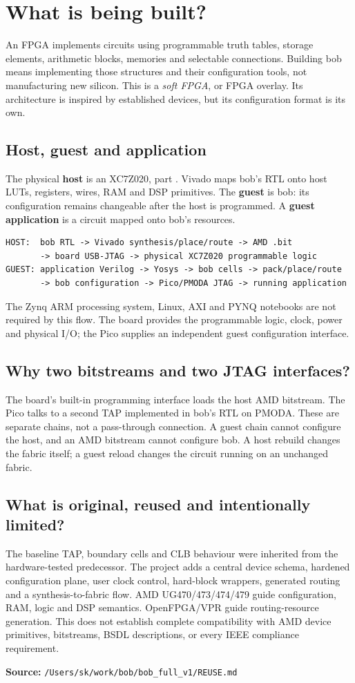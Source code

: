 \documentclass[11pt,a4paper]{article}
\newcommand{\code}[1]{\texttt{\detokenize{#1}}}
\newcommand{\src}[1]{\par\smallskip\noindent\textbf{Source: }\nolinkurl{/Users/sk/work/bob/bob_full_v1/#1}\par\smallskip}
\begin{document}
\section{What is being built?}
\label{sec:concept}
An FPGA implements circuits using programmable truth tables, storage elements,
arithmetic blocks, memories and selectable connections. Building bob means
implementing those structures and their configuration tools, not manufacturing
new silicon. This is a \emph{soft FPGA}, or FPGA overlay. Its architecture is
inspired by established devices, but its configuration format is its own.

\subsection{Host, guest and application}
The physical \textbf{host} is an XC7Z020, part \code{xc7z020clg400-1}. Vivado maps
bob's RTL onto host LUTs, registers, wires, RAM and DSP primitives. The
\textbf{guest} is bob: its configuration remains changeable after the host is
programmed. A \textbf{guest application} is a circuit mapped onto bob's resources.
\begin{lstlisting}[caption={Two separate implementation flows}]
HOST:  bob RTL -> Vivado synthesis/place/route -> AMD .bit
       -> board USB-JTAG -> physical XC7Z020 programmable logic
GUEST: application Verilog -> Yosys -> bob cells -> pack/place/route
       -> bob configuration -> Pico/PMODA JTAG -> running application
\end{lstlisting}
The Zynq ARM processing system, Linux, AXI and PYNQ notebooks are not required by
this flow. The board provides the programmable logic, clock, power and physical
I/O; the Pico supplies an independent guest configuration interface.

\subsection{Why two bitstreams and two JTAG interfaces?}
The board's built-in programming interface loads the host AMD bitstream. The
Pico talks to a second TAP implemented in bob's RTL on PMODA. These are separate
chains, not a pass-through connection. A guest chain cannot configure the host,
and an AMD bitstream cannot configure bob. A host rebuild changes the fabric
itself; a guest reload changes the circuit running on an unchanged fabric.

\subsection{What is original, reused and intentionally limited?}
The baseline TAP, boundary cells and CLB behaviour were inherited from the
hardware-tested predecessor. The project adds a central device schema, hardened
configuration plane, user clock control, hard-block wrappers, generated routing
and a synthesis-to-fabric flow. AMD UG470/473/474/479 guide configuration, RAM,
logic and DSP semantics. OpenFPGA/VPR guide routing-resource generation.
This does not establish complete compatibility with AMD device primitives,
bitstreams, BSDL descriptions, or every IEEE compliance requirement.
\src{REUSE.md}
\end{document}
